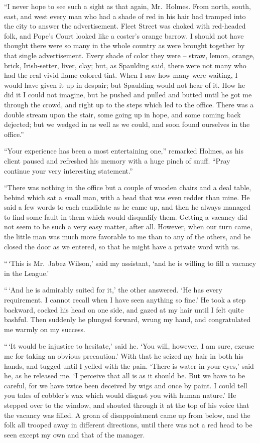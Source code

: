 \begin{sloppypar}
“I never hope to see such a sight as that again, Mr.\ Holmes.
From north, south, east, and west every man who had a shade
of red in his hair had tramped into the city to answer the
advertisement. Fleet Street was choked with red-headed folk,
and Pope’s Court looked like a coster’s orange barrow. I
should not have thought there were so many in the whole
country as were brought together by that single advertisement.
Every shade of color they were -- straw, lemon, orange,
brick, Irish-setter, liv\-er, clay; but, as Spaulding said, there
were not many who had the real vivid flame-colored tint.
When I saw how many were waiting, I would have given it up
in despair; but Spaulding would not hear of it. How he did
it I could not imagine, but he pushed and pulled and butted
until he got me through the crowd, and right up to the steps
which led to the office. There was a double stream upon the
stair, some going up in hope, and some coming back dejected;
but we wedged in as well as we could, and soon found
ourselves in the office.”
\end{sloppypar}

“Your experience has been a most entertaining one,” remarked
Holmes, as his client paused and refreshed his memory
with a huge pinch of snuff. “Pray continue your very
interesting statement.”

“There was nothing in the office but a couple of wooden
chairs and a deal table, behind which sat a small man, with a
head that was even redder than mine. He said a few words
to each candidate as he came up, and then he always managed
to find some fault in them which would disqualify them. Getting
a vacancy did not seem to be such a very easy matter,
after all. However, when our turn came, the little man was
much more favorable to me than to any of the others, and he
closed the door as we entered, so that he might have a private
word with us.

“\,‘This is Mr.~Jabez Wilson,’ said my assistant, ‘and he is
willing to fill a vacancy in the League.’

“\,‘And he is admirably suited for it,’ the other answered.
‘He has every requirement. I cannot recall when I have seen
anything so fine.’ He took a step backward, cocked his head
on one side, and gazed at my hair until I felt quite bashful.
Then suddenly he plunged forward, wrung my hand, and congratulated
me warmly on my success.

“\,‘It would be injustice to hesitate,’ said he. ‘You will,
however, I am sure, excuse me for taking an obvious precaution.’
With that he seized my hair in both his hands, and
tugged until I yelled with the pain. ‘There is water in your
eyes,’ said he, as he released me. ‘I perceive that all is as it
should be. But we have to be careful, for we have twice been
deceived by wigs and once by paint. I could tell you tales of
cobbler’s wax which would disgust you with human nature.’
He stepped over to the window, and shouted through it at the
top of his voice that the vacancy was filled. A groan of
disappointment came up from below, and the folk all trooped
away in different directions, until there was not a red head to
be seen except my own and that of the manager.

